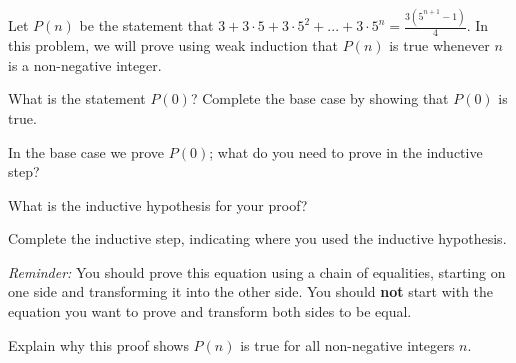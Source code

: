 \documentclass[12pt]{exam}
\begin{document}
Let $P(n)$ be the statement that $3 + 3 \cdot 5 + 3 \cdot 5^2 + ... + 3 \cdot 5^n = \frac{3 (5^{n+1} - 1)}{4}$. In this problem, we will prove using weak induction that $P(n)$ is true whenever $n$ is a non-negative integer.
\begin{parts}
	\item What is the statement $P(0)$? Complete the base case by showing that $P(0)$ is true.
	\item In the base case we prove $P(0)$; what do you need to prove in the inductive step?
	\item What is the inductive hypothesis for your proof?
	\item Complete the inductive step, indicating where you used the inductive hypothesis.

	\textit{Reminder:} You should prove this equation using a chain of equalities, starting on one side and transforming it into the other side.  You should \textbf{not} start with the equation you want to prove and transform both sides to be equal.
	\item Explain why this proof shows $P(n)$ is true for all non-negative integers $n$.
\end{parts}
\end{document}
